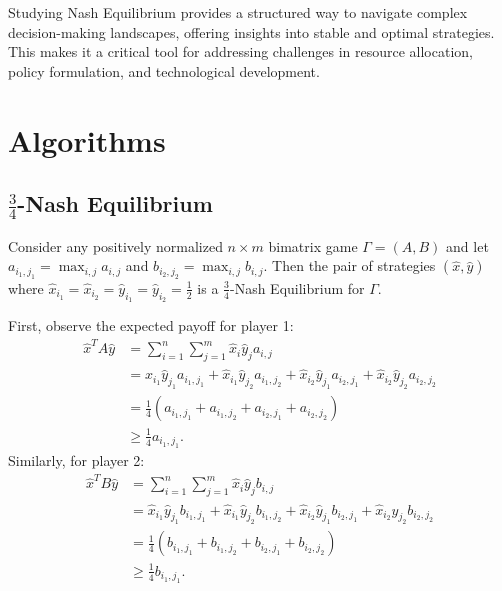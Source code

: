 \documentclass[12pt]{article}
\begin{document}
Studying Nash Equilibrium provides a structured way to navigate complex decision-making landscapes, offering insights into stable and optimal strategies. This makes it a critical tool for addressing challenges in resource allocation, policy formulation, and technological development.

\section{Algorithms}
\subsection{\texorpdfstring{$\frac{3}{4}$}{3/4}-Nash Equilibrium}

    Consider any positively normalized $n \times m$ bimatrix game $\Gamma=(A,B)$ and let $a_{i_1,j_1} = \max_{i,j}a_{i,j}$ and $b_{i_2,j_2} = \max_{i,j}b_{i,j}$. Then the pair of strategies $(\hat{x},\hat{y})$ where $\hat{x}_{i_1}=\hat{x}_{i_2}=\hat{y}_{i_1}=\hat{y}_{i_2}=\frac{1}{2}$ is a $\frac{3}{4}$-Nash Equilibrium for $\Gamma$.




    First, observe the expected payoff for player 1:
    \begin{align*}
        \hat{x}^T A \hat{y} &= \sum_{i=1}^n \sum_{j=1}^m \hat{x}_i \hat{y}_j a_{i,j} \\
        &= \hat{x}_{i_1} \hat{y}_{j_1} a_{i_1,j_1} +  \hat{x}_{i_1} \hat{y}_{j_2} a_{i_1,j_2} +  \hat{x}_{i_2} \hat{y}_{j_1} a_{i_2,j_1} +  \hat{x}_{i_2} \hat{y}_{j_2} a_{i_2,j_2} \\
        &= \frac{1}{4}(a_{i_1,j_1} + a_{i_1,j_2} + a_{i_2,j_1} + a_{i_2,j_2}) \\
        &\geq \frac{1}{4} a_{i_1,j_1}.
    \end{align*}
    Similarly, for player 2:
    \begin{align*}
        \hat{x}^T B \hat{y} &= \sum_{i=1}^n \sum_{j=1}^m \hat{x}_i \hat{y}_j b_{i,j} \\
        &= \hat{x}_{i_1} \hat{y}_{j_1} b_{i_1,j_1} +  \hat{x}_{i_1} \hat{y}_{j_2} b_{i_1,j_2} +  \hat{x}_{i_2} \hat{y}_{j_1} b_{i_2,j_1} +  \hat{x}_{i_2} \hat{y}_{j_2} b_{i_2,j_2} \\
        &= \frac{1}{4}(b_{i_1,j_1} + b_{i_1,j_2} + b_{i_2,j_1} + b_{i_2,j_2}) \\
        &\geq \frac{1}{4} b_{i_1,j_1}.
    \end{align*}
\pagebreak
\end{document}
